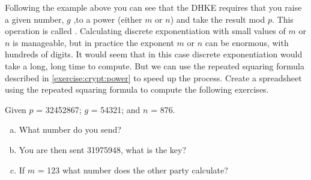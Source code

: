 


Following the example above you can see that the DHKE requires that you raise a given number, $g$ ,to a power (either $m$ or $n$) and take the result mod $p$. This operation is called . Calculating discrete exponentiation with small values of $m$ or $n$ is manageable, but in practice the exponent $m$ or $n$ can be enormous, with hundreds of digits. It would seem that in this case discrete exponentiation would take a long, long time to compute.  But we can use the repeated squaring formula described in  \ref{exercise:crypt:power} to speed up the process.  Create a spreadsheet using the repeated squaring formula to compute the following exercises.
 
\begin{exer}
Given $p$ = 32452867; $g$ = 54321; and $n$ = 876.  
\begin{enumerate}[(a)]
\item What number do you send?  

\item You are then sent 31975948, what is the key? 

\item If $m$ = 123 what number does the other party calculate?
\end{enumerate}
\end{exer}

